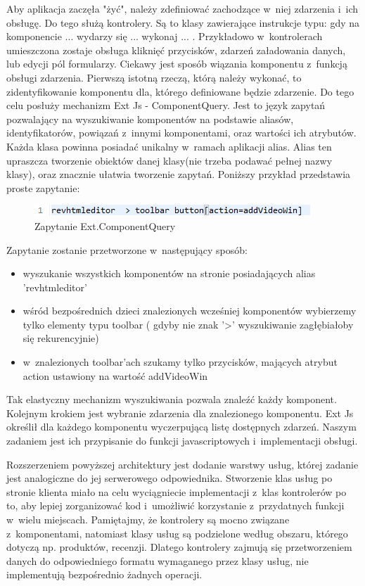 Aby aplikacja zaczęła "żyć", należy zdefiniować zachodzące w~niej zdarzenia i~ich obsługę. Do tego służą kontrolery. Są to klasy zawierające instrukcje typu: gdy na komponencie ... wydarzy się ... wykonaj ... . Przykładowo w~kontrolerach umieszczona zostaje obsługa kliknięć przycisków, zdarzeń załadowania danych, lub edycji pól formularzy. Ciekawy jest sposób wiązania komponentu z~funkcją obsługi zdarzenia. Pierwszą istotną rzeczą, którą należy wykonać, to zidentyfikowanie komponentu dla, którego definiowane będzie zdarzenie. Do tego celu posłuży mechanizm Ext Js - ComponentQuery. Jest to język zapytań pozwalający na wyszukiwanie komponentów na podstawie aliasów, identyfikatorów, powiązań z~innymi komponentami, oraz wartości ich atrybutów. Każda klasa powinna posiadać unikalny w~ramach aplikacji alias. Alias ten upraszcza tworzenie obiektów danej klasy(nie trzeba podawać pełnej nazwy klasy), oraz znacznie ułatwia tworzenie zapytań. Poniższy przykład przedstawia proste zapytanie: 

\begin{figure}[H]
	\centering
	\includegraphics[width=\textwidth]{images/cmp_query.png}
	\caption{Zapytanie Ext.ComponentQuery}
\end{figure}

Zapytanie zostanie przetworzone w~następujący sposób:

\begin{itemize}
\item wyszukanie wszystkich komponentów na stronie posiadających alias 'revhtmleditor'
\item wśród bezpośrednich dzieci znalezionych wcześniej komponentów wybierzemy tylko elementy typu toolbar ( gdyby nie znak '>' wyszukiwanie zagłębiałoby się rekurencyjnie)
\item w~znalezionych toolbar'ach szukamy tylko przycisków, mających atrybut action ustawiony na wartość addVideoWin
\end{itemize}

Tak elastyczny mechanizm wyszukiwania pozwala znaleźć każdy komponent.
Kolejnym krokiem jest wybranie zdarzenia dla znalezionego komponentu. Ext Js określił dla każdego komponentu wyczerpującą listę dostępnych zdarzeń. Naszym zadaniem jest ich przypisanie do funkcji javascriptowych i~implementacji obsługi.

Rozszerzeniem powyższej architektury jest dodanie warstwy usług, której zadanie jest analogiczne do jej serwerowego odpowiednika. Stworzenie klas usług po stronie klienta miało na celu wyciągniecie implementacji z~klas kontrolerów po to, aby lepiej zorganizować kod i~umożliwić korzystanie z~przydatnych funkcji w~wielu miejscach. Pamiętajmy, że kontrolery są mocno związane z~komponentami, natomiast klasy usług są podzielone według obszaru, którego dotyczą np. produktów, recenzji. Dlatego kontrolery zajmują się przetworzeniem danych do odpowiedniego formatu wymaganego przez klasy usług, nie implementują bezpośrednio żadnych operacji.




